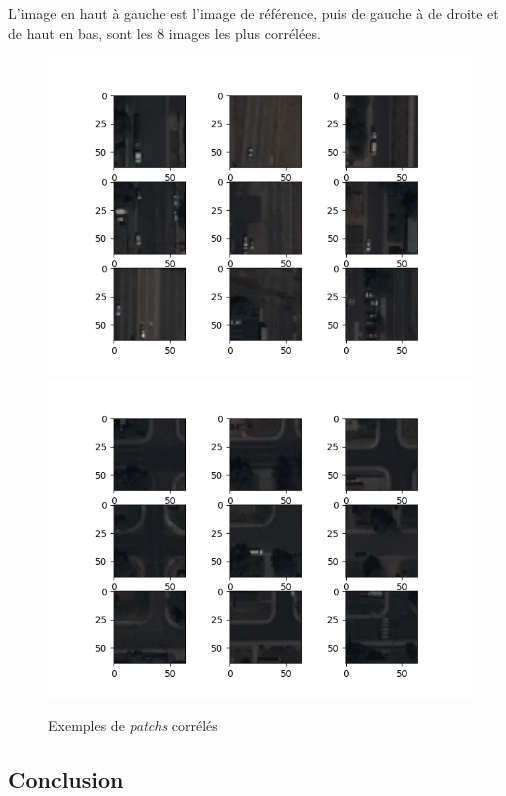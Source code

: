 \documentclass[a4paper, 11pt]{report}
\begin{document}
L'image en haut à gauche est l'image de référence, puis de gauche à de droite et de haut en bas, sont les 8 images les plus corrélées.

\begin{figure}[H]
	\begin{center}
		\includegraphics[scale=0.9]{Images/CommerceCity_Correlation_1.png}
		\includegraphics[scale=0.9]{Images/CommerceCity_Correlation_2.png}
		\caption{Exemples de \emph{patchs} corrélés}
	\end{center}
\end{figure}
\subsection{Conclusion}
\end{document}
